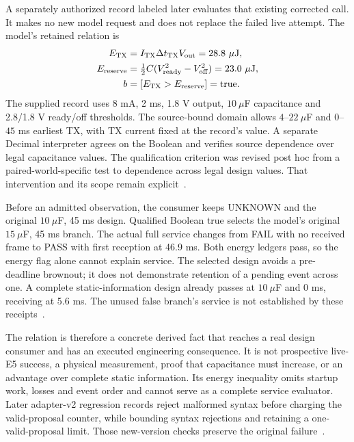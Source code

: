 A separately authorized record labeled
 later evaluates that existing
corrected call. It makes no new model request and does not replace the
failed live attempt. The model's retained relation is
\begin{align}
 E_{\rm TX}&=I_{\rm TX}\Delta t_{\rm TX}V_{\rm out}=28.8~\mu\mathrm J,\\
 E_{\rm reserve}&=\tfrac12 C(V_{\rm ready}^2-V_{\rm off}^2)=23.0~\mu\mathrm J,\\
 b&=[E_{\rm TX}>E_{\rm reserve}]=\mathrm{true}.
\end{align}
The supplied record uses 8 mA, 2 ms, 1.8 V output, $10~\mu$F capacitance
and 2.8/1.8 V ready/off thresholds. The source-bound domain allows
$4$--$22~\mu$F and $0$--$45$ ms earliest TX, with TX current fixed at
the record's value. A separate Decimal interpreter agrees on the Boolean
and verifies source dependence over legal capacitance values. The
qualification criterion was revised post hoc from a paired-world-specific
test to dependence across legal design values. That intervention and its
scope remain explicit~\cite{posthoc}.

Before an admitted observation, the consumer keeps UNKNOWN and the original
$10~\mu$F, 45 ms design. Qualified Boolean true selects the model's
original $15~\mu$F, 45 ms branch. The actual full service changes from
FAIL with no received frame to PASS with first reception at 46.9 ms. Both
energy ledgers pass, so the energy flag alone cannot explain service. The
selected design avoids a pre-deadline brownout; it does not demonstrate
retention of a pending event across one. A complete static-information
design already passes at $10~\mu$F and 0 ms, receiving at 5.6 ms.
The unused false branch's service is not established by these
receipts~\cite{posthoc}.

The relation is therefore a concrete derived fact that reaches a real
design consumer and has an executed engineering consequence. It is not
prospective live-E5 success, a physical measurement, proof that capacitance
must increase, or an advantage over complete static information. Its
energy inequality omits startup work, losses and event order and cannot
serve as a complete service evaluator. Later adapter-v2 regression records
reject malformed syntax before charging the valid-proposal counter, while
bounding syntax rejections and retaining a one-valid-proposal limit. Those
new-version checks preserve the original failure~\cite{adapter}.
\FloatBarrier

